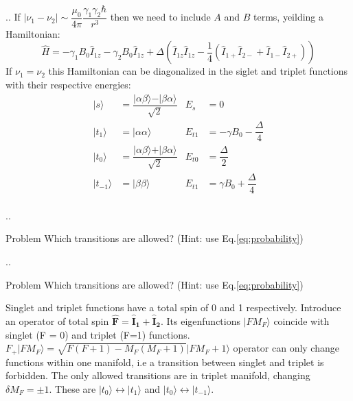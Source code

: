 \documentclass{beamer}
\begin{document}
\begin{frame}{\thesection.\thesubsection. \insertsubsection}
   If  $\mid \nu_1 -\nu_2 \mid \sim \dfrac{\mu_0}{4 \pi} \dfrac{\gamma_1 \gamma_2 \hbar}{r^3}$ then we need to include $A$ and $B$ terms, yeilding a Hamiltonian:
   \begin{equation}
     \hat{H} = -\gamma_1 B_0 \hat{I}_{1z} -\gamma_2 B_0 \hat{I}_{1z}  + \Delta ( \hat{I}_{1z} \hat{I}_{1z}  - \dfrac{1}{4} (\hat{I}_{1+} \hat{I}_{2-} + \hat{I}_{1-} \hat{I}_{2+} ) )  
   \end{equation}
   If $\nu_1 = \nu_2 $ this Hamiltonian can be diagonalized in the siglet and triplet functions with their respective energies:
   \begin{equation}
	   \begin{array}{clcl}	      
     	   \vert s \rangle &= \dfrac{\vert \alpha \beta \rangle - \vert  \beta \alpha \rangle}{\sqrt{2}} &  E_s &= 0 \\
	      \vert t_1 \rangle &=  \vert \alpha \alpha \rangle & E_{t1} &= -\gamma B_0 - \dfrac{\Delta}{4}\\
	      \vert t_0 \rangle &=  \dfrac{\vert \alpha \beta \rangle + \vert  \beta \alpha \rangle}{\sqrt{2}} & E_{t0} &= \dfrac{\Delta}{2} \\
	      \vert t_{-1} \rangle &= \vert \beta \beta \rangle	& E_{t1} &= \gamma B_0 + \dfrac{\Delta}{4}\\      
	   \end{array}   
   \end{equation}
\end{frame}

\begin{frame}{\thesection.\thesubsection. \insertsubsection}
    \begin{block}{Problem}
    	Which transitions are allowed? (Hint: use Eq.\ref{eq:probability})
    \end{block}    
\end{frame}

\begin{frame}{\thesection.\thesubsection. \insertsubsection}
	\begin{block}{Problem}
		Which transitions are allowed? (Hint: use Eq.\ref{eq:probability})
	\end{block}
	Singlet and triplet functions have a total spin of 0 and 1 respectively.  
	Introduce an operator of total spin $\bm{\hat{F}} = \bm{\hat{I}_{1}} + \bm{\hat{I}_2}$.  Its eigenfunctions $\vert F M_F \rangle$ coincide with singlet (F = 0) and triplet (F=1) functions. 
	$F_{+} \vert F M_F \rangle = \sqrt{F(F+1)-M_F(M_F+1)} \vert F M_F+1 \rangle$ operator can only change functions within one manifold, i.e a transition between singlet and triplet is forbidden.
	The only allowed transitions are in triplet manifold, changing $\delta M_F = \pm 1$. These are $\vert t_0 \rangle \leftrightarrow \vert t_1 \rangle$ and  $\vert t_0 \rangle \leftrightarrow \vert t_{-1} \rangle$.
\end{frame}
\end{document}
